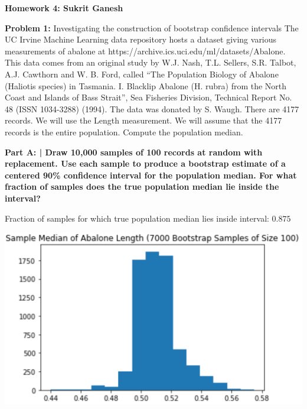 \documentclass{article}
\begin{document}
 
 \begin{center}
     \Huge\textbf{Homework 4: Sukrit Ganesh}\par
 \end{center}
 
  \noindent\makebox[\linewidth]{\rule{\paperwidth}{0.4pt}}\newline
 
 \begin{center}
      \Large\textbf{Problem 1:} Investigating the construction of bootstrap confidence intervals The UC Irvine Machine Learning data repository hosts a dataset giving various measurements of abalone at https://archive.ics.uci.edu/ml/datasets/Abalone. This data comes from an original study by W.J. Nash, T.L. Sellers, S.R. Talbot, A.J. Cawthorn and W. B. Ford, called “The Population Biology of Abalone (Haliotis species) in Tasmania. I. Blacklip Abalone (H. rubra) from the North Coast and Islands of Bass Strait”, Sea Fisheries Division, Technical Report No. 48 (ISSN 1034-3288) (1994). The data was donated by S. Waugh. There are 4177 records. We will use the Length measurement. We will assume that the 4177 records is the entire population. Compute the population median. \par
 \end{center}
 
 \textbf{Part A: | Draw 10,000 samples of 100 records at random with replacement. Use each sample to produce a bootstrap estimate of a centered 90\% confidence interval for the population median. For what fraction of samples does the true population median lie inside the interval?}\newline
 
 Fraction of samples for which true population median lies inside interval: $0.875$
 
 \includegraphics{HW7_1.PNG}
 
\end{document}
